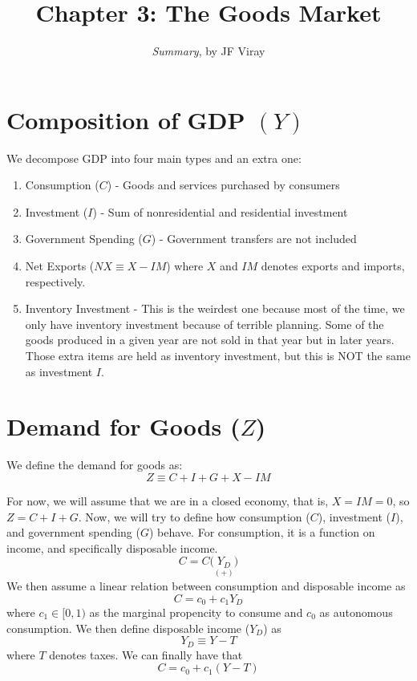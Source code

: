 \documentclass{extarticle}
\title{\vspace{-2em}Chapter 3: The Goods Market}
\author{\emph{Summary}, by JF Viray}
\date{}
\begin{document}
\maketitle



\section{Composition of GDP $(Y)$}
We decompose GDP into four main types and an extra one:
\begin{enumerate}
  \item Consumption ($C$) - Goods and services purchased by consumers
  \item Investment ($I$) - Sum of nonresidential and residential investment
  \item Government Spending ($G$) - Government transfers are not included
  \item Net Exports ($NX \equiv X - IM$) where $X$ and $IM$ denotes exports and imports, respectively.
  \item Inventory Investment - This is the weirdest one because most of the time, we only have inventory investment because of terrible planning. Some of the goods produced in a given year are not sold in that year but in later years. Those extra items are held as inventory investment, but this is NOT the same as investment $I$.
\end{enumerate}

\section{Demand for Goods ($Z$)}
We define the demand for goods as:
$$Z \equiv C + I + G + X - IM$$

\noindent For now, we will assume that we are in a closed economy, that is, $X = IM = 0$, so $Z = C + I + G$. Now, we will try to define how consumption ($C$), investment ($I$), and government spending ($G$) behave. For consumption, it is a function on income, and specifically disposable income. 
$$ C = C \bigl( \underset{(+)}{Y_D} \bigr)$$
We then assume a linear relation between consumption and disposable income as
$$C = c_0 + c_1 Y_D$$
where $c_1 \in [0, 1)$ as the marginal propencity to consume and $c_0$ as autonomous consumption. We then define disposable income ($Y_D$) as $$Y_D \equiv Y - T $$ where $T$ denotes taxes. We can finally have that 
$$C = c_0 + c_1 (Y - T)$$ 
\end{document}
